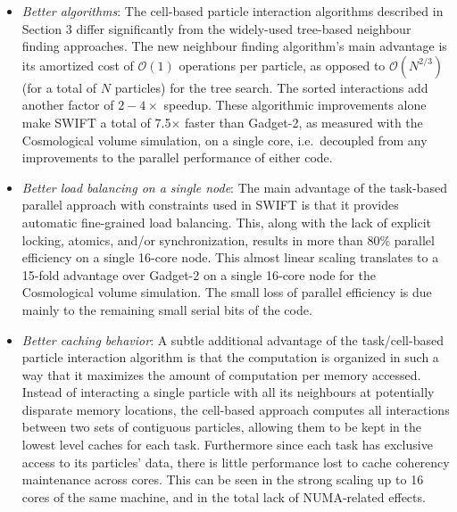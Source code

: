 \documentclass[final]{siamltex}
\newcommand{\oh}[1]
    {\mbox{$ {\mathcal O}( #1 ) $}}
\begin{document}
\begin{itemize}

    \item {\em Better algorithms}: The cell-based particle interaction
        algorithms described in Section 3 differ significantly from the
        widely-used tree-based neighbour finding approaches.
        The new neighbour finding algorithm's main advantage is
        its amortized cost of \oh{1} operations per particle,
        as opposed to \oh{N^{2/3}} (for a total of $N$ particles)
        for the tree search.
        The sorted interactions add another factor of $2-4\times$ speedup.
        These algorithmic improvements alone make SWIFT a total
        of 7.5$\times$ faster than Gadget-2, as measured with the
        Cosmological volume simulation, on a single core, i.e.~decoupled
        from any improvements to the parallel performance of either code.
        
    \item {\em Better load balancing on a single node}: The main advantage
        of the task-based parallel approach with constraints
        used in SWIFT is that it
        provides automatic fine-grained load balancing.
        This, along with the
        lack of explicit locking, atomics, and/or synchronization,
        results in more than 80\% parallel efficiency
        on a single 16-core node.
        This almost linear scaling translates to a 15-fold advantage
        over Gadget-2 on a single 16-core node for the Cosmological
        volume simulation.
        The small loss of parallel efficiency is due mainly to the remaining
        small serial bits of the code.
        
    \item {\em Better caching behavior}: A subtle additional advantage of
        the task/cell-based particle interaction algorithm is that
        the computation is organized in such a way that it maximizes the
        amount of computation per memory accessed.
        Instead of interacting a single particle with all its neighbours
        at potentially disparate memory locations, the cell-based
        approach computes all interactions between two sets of contiguous
        particles, allowing them to be kept in the lowest level caches
        for each task.
        Furthermore since each task has exclusive access to its particles'
        data, there is little performance lost to cache coherency maintenance
        across cores.
        This can be seen in the strong scaling up to 16 cores of the same
        machine, and in the total lack of NUMA-related effects.
    

\end{itemize}
\end{document}
